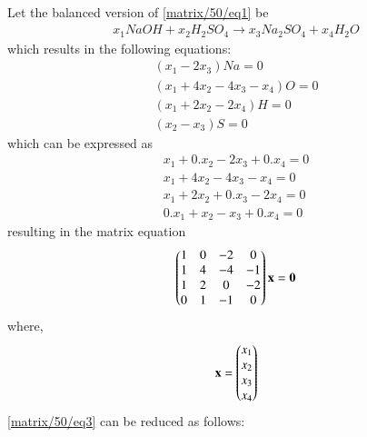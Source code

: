 Let the balanced version of \eqref{matrix/50/eq1} be
\begin{align}
   x_{1}NaOH + x_{2}H_2SO_4 \xrightarrow{} 
   x_{3}Na_2SO_4 + x_{4}H_2O \label{matrix/50/eq2}
\end{align}
which results in the following equations:
\begin{align}
    (x_{1}-2x_{3}) Na= 0\\
    (x_{1}+4x_{2}-4x_{3}-x_{4}) O= 0\\
    (x_{1}+2x_{2}-2x_{4}) H=0\\
    (x_{2}-x_{3}) S= 0
\end{align}
which can be expressed as
\begin{align}
    x_{1}+ 0.x_{2}- 2x_{3}+ 0.x_{4} = 0\\
    x_{1}+ 4x_{2}- 4x_{3}- x_{4} = 0\\
    x_{1}+ 2x_{2}+ 0.x_{3}- 2x_{4} = 0\\
    0.x_{1}+ x_{2}- x_{3}+ 0.x_{4} = 0
\end{align}
resulting in the matrix equation
\begin{align}
    \begin{pmatrix}1 & 0 & -2 & 0\\
           1 & 4 & -4 & -1\\
           1 & 2 & 0 & -2\\
           0 & 1 & -1 & 0\end{pmatrix}\mathbf{x}
           =\mathbf{0}    \label{matrix/50/eq3}
\end{align}
where,
\begin{align}
   \mathbf{x}= \begin{pmatrix}x_{1}\\x_{2}\\x_{3}\\x_{4}\end{pmatrix}
\end{align}
\eqref{matrix/50/eq3} can be reduced as follows:
